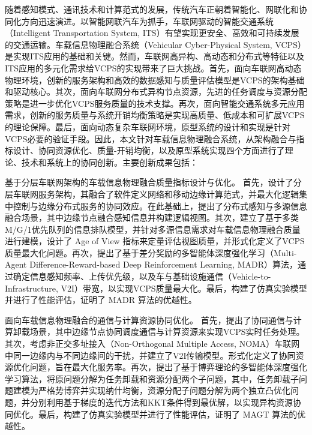 \begin{cabstract}	%

随着感知模式、通讯技术和计算范式的发展，传统汽车正朝着智能化、网联化和协同化方向迅速演进。以智能网联汽车为抓手，车联网驱动的智能交通系统（Intelligent Transportation System, ITS）有望实现更安全、高效和可持续发展的交通运输。车载信息物理融合系统（Vehicular Cyber-Physical System, VCPS）是实现ITS应用的基础和关键。然而，车联网高异构、高动态和分布式等特征以及ITS应用的多元化需求给VCPS的实现带来了巨大挑战。首先，面向车联网高动态物理环境，创新的服务架构和高效的数据感知与质量评估模型是VCPS的架构基础和驱动核心。其次，面向车联网分布式异构节点资源，先进的任务调度与资源分配策略是进一步优化VCPS服务质量的技术支撑。再次，面向智能交通系统多元应用需求，创新的服务质量与系统开销均衡策略是实现高质量、低成本和可扩展VCPS的理论保障。最后，面向动态复杂车联网环境，原型系统的设计和实现是针对VCPS必要的验证手段。因此，本文针对车载信息物理融合系统，从架构融合与指标设计、协同资源优化、质量-开销均衡，以及原型系统实现四个方面进行了理论、技术和系统上的协同创新。主要创新成果包括：

 基于分层车联网架构的车载信息物理融合质量指标设计与优化。
首先，设计了分层车联网服务架构，其融合了软件定义网络和移动边缘计算范式，并最大化逻辑集中控制与边缘分布式服务的协同效应。在此基础上，提出了分布式感知与多源信息融合场景，其中边缘节点融合感知信息并构建逻辑视图。其次，建立了基于多类M/G/1优先队列的信息排队模型，并针对多源信息需求对车载信息物理融合质量进行建模，设计了 Age of View 指标来定量评估视图质量，并形式化定义了VCPS质量最大化问题。再次，提出了基于差分奖励的多智能体深度强化学习（Multi-Agent Difference-Reward-based Deep Reinforcement Learning, MADR）算法，通过确定信息感知频率、上传优先级，以及车与基础设施通信（Vehicle-to-Infrastructure, V2I）带宽，以实现VCPS质量最大化。最后，构建了仿真实验模型并进行了性能评估，证明了 MADR 算法的优越性。

 面向车载信息物理融合的通信与计算资源协同优化。
首先，提出了协同通信与计算卸载场景，其中边缘节点协同调度通信与计算资源来实现VCPS实时任务处理。其次，考虑非正交多址接入（Non-Orthogonal Multiple Access, NOMA）车联网中同一边缘内与不同边缘间的干扰，并建立了V2I传输模型。形式化定义了协同资源优化问题，旨在最大化服务率。再次，提出了基于博弈理论的多智能体深度强化学习算法，将原问题分解为任务卸载和资源分配两个子问题，其中，任务卸载子问题建模为严格势博弈并实现纳什均衡，资源分配子问题分解为两个独立凸优化问题，并分别利用基于梯度的迭代方法和KKT条件得到最优解，以实现异构资源协同优化。最后，构建了仿真实验模型并进行了性能评估，证明了 MAGT 算法的优越性。


\end{cabstract}
